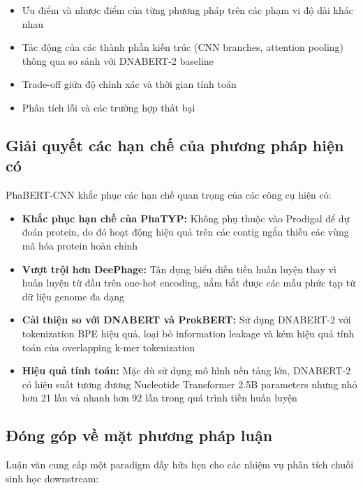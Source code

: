 \begin{itemize}
    \item Ưu điểm và nhược điểm của từng phương pháp trên các phạm vi độ dài khác nhau
    \item Tác động của các thành phần kiến trúc (CNN branches, attention pooling) thông qua so sánh với DNABERT-2 baseline
    \item Trade-off giữa độ chính xác và thời gian tính toán
    \item Phân tích lỗi và các trường hợp thất bại
\end{itemize}

\subsection{Giải quyết các hạn chế của phương pháp hiện có}

PhaBERT-CNN khắc phục các hạn chế quan trọng của các công cụ hiện có:

\begin{itemize}
    \item \textbf{Khắc phục hạn chế của PhaTYP:} Không phụ thuộc vào Prodigal để dự đoán protein, do đó hoạt động hiệu quả trên các contig ngắn thiếu các vùng mã hóa protein hoàn chỉnh

    \item \textbf{Vượt trội hơn DeePhage:} Tận dụng biểu diễn tiền huấn luyện thay vì huấn luyện từ đầu trên one-hot encoding, nắm bắt được các mẫu phức tạp từ dữ liệu genome đa dạng

    \item \textbf{Cải thiện so với DNABERT và ProkBERT:} Sử dụng DNABERT-2 với tokenization BPE hiệu quả, loại bỏ information leakage và kém hiệu quả tính toán của overlapping k-mer tokenization

    \item \textbf{Hiệu quả tính toán:} Mặc dù sử dụng mô hình nền tảng lớn, DNABERT-2 có hiệu suất tương đương Nucleotide Transformer 2.5B parameters nhưng nhỏ hơn 21 lần và nhanh hơn 92 lần trong quá trình tiền huấn luyện
\end{itemize}

\subsection{Đóng góp về mặt phương pháp luận}

Luận văn cung cấp một paradigm đầy hứa hẹn cho các nhiệm vụ phân tích chuỗi sinh học downstream:

